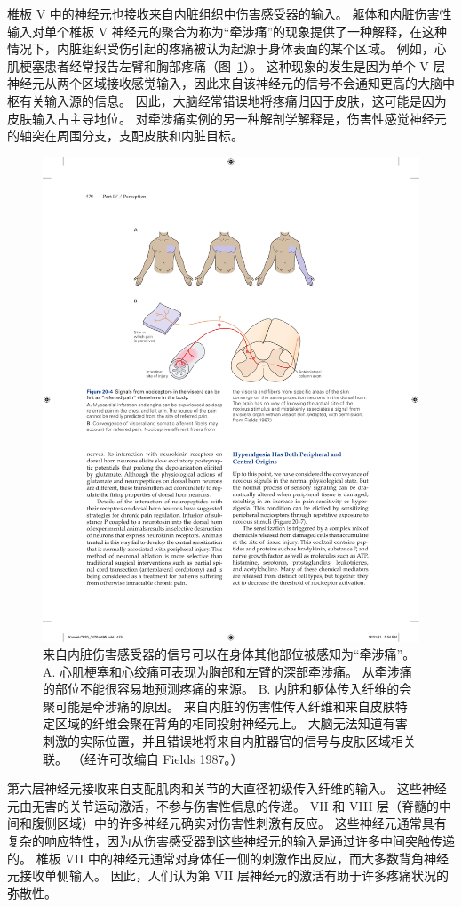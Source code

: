 椎板 V 中的神经元也接收来自内脏组织中伤害感受器的输入。
躯体和内脏伤害性输入对单个椎板 V 神经元的聚合为称为“牵涉痛”的现象提供了一种解释，在这种情况下，内脏组织受伤引起的疼痛被认为起源于身体表面的某个区域。 
例如，心肌梗塞患者经常报告左臂和胸部疼痛（图~\ref{fig:20_4}）。
这种现象的发生是因为单个 V 层神经元从两个区域接收感觉输入，因此来自该神经元的信号不会通知更高的大脑中枢有关输入源的信息。
因此，大脑经常错误地将疼痛归因于皮肤，这可能是因为皮肤输入占主导地位。
对牵涉痛实例的另一种解剖学解释是，伤害性感觉神经元的轴突在周围分支，支配皮肤和内脏目标。


\begin{figure}[htbp]
	\centering
	\includegraphics[width=0.7\linewidth]{chap20/fig_20_4}
	\caption{来自内脏伤害感受器的信号可以在身体其他部位被感知为“牵涉痛”。
		A. 心肌梗塞和心绞痛可表现为胸部和左臂的深部牵涉痛。
		从牵涉痛的部位不能很容易地预测疼痛的来源。
		B. 内脏和躯体传入纤维的会聚可能是牵涉痛的原因。
		来自内脏的伤害性传入纤维和来自皮肤特定区域的纤维会聚在背角的相同投射神经元上。
		大脑无法知道有害刺激的实际位置，并且错误地将来自内脏器官的信号与皮肤区域相关联。 （经许可改编自 Fields 1987。）}
	\label{fig:20_4}
\end{figure}


第六层神经元接收来自支配肌肉和关节的大直径初级传入纤维的输入。
这些神经元由无害的关节运动激活，不参与伤害性信息的传递。
VII 和 VIII 层（脊髓的中间和腹侧区域）中的许多神经元确实对伤害性刺激有反应。
这些神经元通常具有复杂的响应特性，因为从伤害感受器到这些神经元的输入是通过许多中间突触传递的。
椎板 VII 中的神经元通常对身体任一侧的刺激作出反应，而大多数背角神经元接收单侧输入。
因此，人们认为第 VII 层神经元的激活有助于许多疼痛状况的弥散性。



